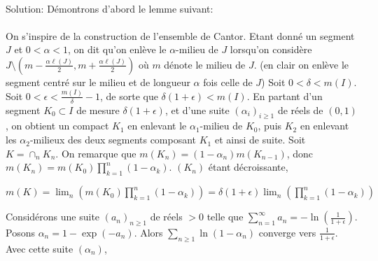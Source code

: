 \documentclass{report}
\begin{document}
\subsection{} \\\\
Solution: Démontrons d'abord le lemme suivant: \newline \newline
{} \\ \\
On s'inspire de la construction de l'ensemble de Cantor. \newline
Etant donné un segment $J$ et $0<\alpha<1$, on dit qu'on enlève le $\alpha$-milieu de $J$ lorsqu'on considère $J\setminus (m- \frac{\alpha\ell(J)}2, m+ \frac{\alpha\ell(J)}2)$ où $m$ dénote le milieu de $J$. \newline
(en clair on enlève le segment centré sur le milieu et de longueur $\alpha$ fois celle de $J$)\newline
Soit $0<\delta < m(I)$. \newline
Soit $0<\epsilon<\frac{m(I)}{\delta}-1$, de sorte que $\delta(1+\epsilon)<m(I)$. En partant d'un segment $K_0\subset I$ de mesure $\delta(1+\epsilon)$, et d'une suite $(\alpha_i)_{i\geq 1}$ de réels de $(0,1)$, on obtient un compact $K_1$ en enlevant le $\alpha_1$-milieu de $K_0$, puis $K_2$ en enlevant les $\alpha_2$-milieux des deux segments composant $K_1$ et ainsi de suite. Soit $K=\cap_n K_n$. On remarque que $m(K_n) = (1-\alpha_n)m(K_{n-1})$, donc $m(K_n) = m(K_0)\prod_{k=1}^n (1-\alpha_k)$. \newline
$(K_n)$ étant décroissante, \newline 
\centerline{$m(K) = \lim_n \left(m(K_0)\prod_{k=1}^n (1-\alpha_k)\right)=\delta(1+\epsilon) \lim_n \left(\prod_{k=1}^n (1-\alpha_k)\right)$} \newline \newline
Considérons une suite $(a_n)_{n\geq 1}$ de réels $>0$ telle que $\sum_{n=1}^\infty a_n = -\ln\left(\frac{1}{1+\epsilon}\right)$. Posons $\alpha_n=1-\exp(-a_n)$. Alors $\sum_{n\geq 1}\ln (1-\alpha_n)$ converge vers $\frac{1}{1+\epsilon}$. Avec cette suite $(\alpha_n)$, \newline 
\end{document}
